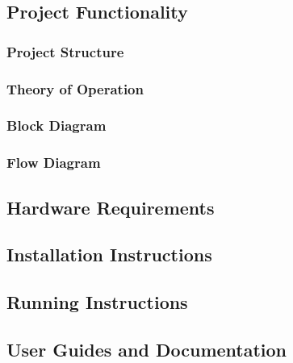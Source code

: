 \subsection{Project Functionality}
\subsubsection{Project Structure}
\subsubsection{Theory of Operation}
\subsubsection{Block Diagram}
\subsubsection{Flow Diagram}

\subsection{Hardware Requirements}

\subsection{Installation Instructions}

\subsection{Running Instructions}

\subsection{User Guides and Documentation}

